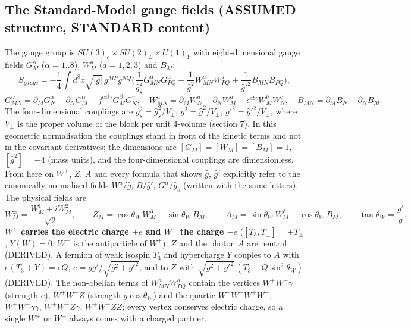\documentclass[
  10pt,
]{article}
\begin{document}
\hypertarget{the-standard-model-gauge-fields-assumed-structure-standard-content}{%
\subsection{The Standard-Model gauge fields (ASSUMED structure, STANDARD
content)}\label{the-standard-model-gauge-fields-assumed-structure-standard-content}}

The gauge group is \(SU(3)_c\times SU(2)_L\times U(1)_Y\) with
eight-dimensional gauge fields \(G^\alpha_M\) (\(\alpha = 1..8\)),
\(W^a_M\) (\(a = 1, 2, 3\)) and \(B_M\):
\[ S_{gauge} = -\frac14\int d^8x\sqrt{|g|}\,g^{MP}g^{NQ}\Big(\frac{1}{\hat g_s^2}G^\alpha_{MN}G^\alpha_{PQ} + \frac{1}{\hat g^2}W^a_{MN}W^a_{PQ}
   + \frac{1}{\hat g'^2}B_{MN}B_{PQ}\Big), \]
\[ G^\alpha_{MN} = \partial_MG^\alpha_N - \partial_NG^\alpha_M + f^{\alpha\beta\gamma}G^\beta_MG^\gamma_N,\quad
   W^a_{MN} = \partial_MW^a_N - \partial_NW^a_M + \epsilon^{abc}W^b_MW^c_N,\quad B_{MN} = \partial_MB_N - \partial_NB_M . \]
The four-dimensional couplings are \(g_s^2 = \hat g_s^2/V_\perp\),
\(g^2 = \hat g^2/V_\perp\), \(g'^2 = \hat g'^2/V_\perp\), where
\(V_\perp\) is the proper volume of the block per unit 4-volume (section
7). In this geometric normalisation the couplings stand in front of the
kinetic terms and not in the covariant derivatives; the dimensions are
\([G_M] = [W_M] = [B_M] = 1\), \([\hat g^2] = -4\) (mass units), and the
four-dimensional couplings are dimensionless. From here on \(W^\pm\),
\(Z\), \(A\) and every formula that shows \(\hat g\), \(\hat g'\)
explicitly refer to the canonically normalised fields \(W^a/\hat g\),
\(B/\hat g'\), \(G^\alpha/\hat g_s\) (written with the same letters).
The physical fields are
\[ W^\pm_M = \frac{W^1_M \mp iW^2_M}{\sqrt2},\qquad Z_M = \cos\theta_W\,W^3_M - \sin\theta_W\,B_M,\qquad
   A_M = \sin\theta_W\,W^3_M + \cos\theta_W\,B_M,\qquad \tan\theta_W = \frac{g'}{g} . \]
\textbf{\(W^+\) carries the electric charge \(+e\) and \(W^-\) the
charge \(-e\)} (\([T_3, T_\pm] = \pm T_\pm\), \(Y(W) = 0\); \(W^-\) is
the antiparticle of \(W^+\)); \(Z\) and the photon \(A\) are neutral
(DERIVED). A fermion of weak isospin \(T_3\) and hypercharge \(Y\)
couples to \(A\) with \(e(T_3 + Y) = eQ\),
\(e = gg'/\sqrt{g^2 + g'^2}\), and to \(Z\) with
\(\sqrt{g^2 + g'^2}\,(T_3 - Q\sin^2\theta_W)\) (DERIVED). The
non-abelian terms of \(W^a_{MN}W^a_{PQ}\) contain the vertices
\(W^+W^-\gamma\) (strength \(e\)), \(W^+W^-Z\) (strength
\(g\cos\theta_W\)) and the quartic \(W^+W^-W^+W^-\),
\(W^+W^-\gamma\gamma\), \(W^+W^-Z\gamma\), \(W^+W^-ZZ\); every vertex
conserves electric charge, so a single \(W^+\) or \(W^-\) always comes
with a charged partner.
\end{document}
